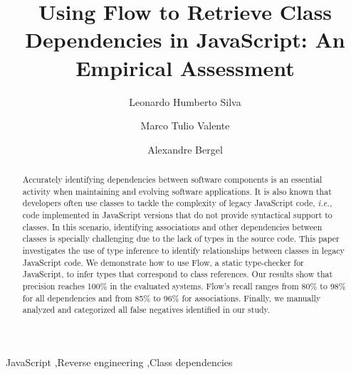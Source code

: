 \documentclass[review]{elsarticle}
\begin{document}
\begin{frontmatter}

\title{Using Flow to Retrieve Class Dependencies in JavaScript: An Empirical Assessment}



\author[mymainaddress]{Leonardo Humberto Silva}

\author[mtovaddress]{Marco Tulio Valente}

\author[bergeladdress]{Alexandre Bergel}

\address[mymainaddress]{Federal Institute of Northern Minas Gerais}
\address[mtovaddress]{Federal University of Minas Gerais}
\address[bergeladdress]{University of Chile}

\begin{abstract}
Accurately identifying dependencies between software components is an essential activity when maintaining and evolving software applications. It is also known that developers often use classes to tackle the complexity of legacy JavaScript code, \emph{i.e.}, code implemented in JavaScript versions that do not provide syntactical support to classes. In this scenario, identifying associations and other dependencies between classes is specially challenging due to the lack of types in the source code. This paper investigates the use of type inference to identify relationships between classes in legacy JavaScript code. We demonstrate how to use Flow, a static type-checker for JavaScript, to infer types that correspond to class references. Our results show that precision reaches 100\% in the evaluated systems. Flow's recall ranges from 80\% to 98\% for all dependencies and from 85\% to 96\% for associations. Finally, we manually analyzed and categorized all false negatives identified in our study.
\end{abstract}

\begin{keyword}
JavaScript \sep Reverse engineering \sep Class dependencies
\end{keyword}

\end{frontmatter}
\end{document}
